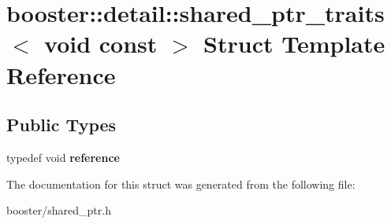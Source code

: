 \section{booster\-:\-:detail\-:\-:shared\-\_\-ptr\-\_\-traits$<$ void const $>$ Struct Template Reference}
\label{structbooster_1_1detail_1_1shared__ptr__traits_3_01void_01const_01_01_4}
\subsection*{Public Types}
\begin{DoxyCompactItemize}
\item 
typedef void {\bfseries reference}\label{structbooster_1_1detail_1_1shared__ptr__traits_3_01void_01const_01_01_4_a1ff49086832d34498d61f5962b7f4eea}

\end{DoxyCompactItemize}


The documentation for this struct was generated from the following file\-:\begin{DoxyCompactItemize}
\item 
booster/shared\-\_\-ptr.\-h\end{DoxyCompactItemize}
